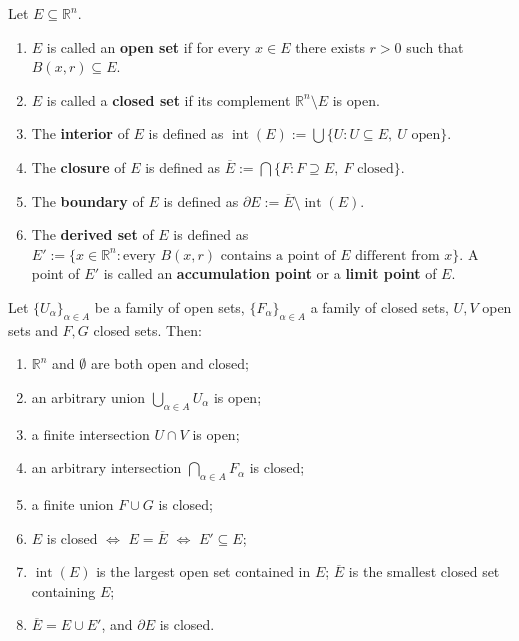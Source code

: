 \begin{definition}\label{def:open_closed_set}
Let $E \subseteq \mathbb{R}^n$.
\begin{enumerate}[label=(\roman*)]
    \item $E$ is called an \textbf{open set} if for every $x \in E$ there exists $r > 0$ such that $B(x, r) \subseteq E$.
    \item $E$ is called a \textbf{closed set} if its complement $\mathbb{R}^n \setminus E$ is open.
    \item The \textbf{interior} of $E$ is defined as $\operatorname{int}(E) := \bigcup \{U : U \subseteq E,\ U \text{ open}\}$.
    \item The \textbf{closure} of $E$ is defined as $\overline{E} := \bigcap \{F : F \supseteq E,\ F \text{ closed}\}$.
    \item The \textbf{boundary} of $E$ is defined as $\partial E := \overline{E} \setminus \operatorname{int}(E)$.
    \item The \textbf{derived set} of $E$ is defined as $E' := \{x \in \mathbb{R}^n : \allowbreak\text{every } B(x, r) \allowbreak\text{ contains a point of } E \allowbreak\text{ different from } x\}$. A point of $E'$ is called an \textbf{accumulation point} or a \textbf{limit point} of $E$.
\end{enumerate}
\end{definition}

\begin{proposition}\label{prop:open_closed_properties}
Let $\{U_\alpha\}_{\alpha \in A}$ be a family of open sets, $\{F_\alpha\}_{\alpha \in A}$ a family of closed sets, $U, V$ open sets and $F, G$ closed sets. Then:
\begin{enumerate}[label=(\roman*)]
    \item $\mathbb{R}^n$ and $\emptyset$ are both open and closed;
    \item an arbitrary union $\bigcup_{\alpha \in A} U_\alpha$ is open;
    \item a finite intersection $U \cap V$ is open;
    \item an arbitrary intersection $\bigcap_{\alpha \in A} F_\alpha$ is closed;
    \item a finite union $F \cup G$ is closed;
    \item $E$ is closed $\iff$ $E = \overline{E}$ $\iff$ $E' \subseteq E$;
    \item $\operatorname{int}(E)$ is the largest open set contained in $E$; $\overline{E}$ is the smallest closed set containing $E$;
    \item $\overline{E} = E \cup E'$, and $\partial E$ is closed.
\end{enumerate}
\end{proposition}

